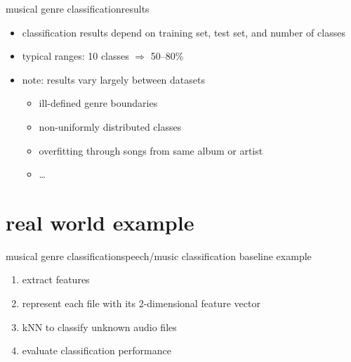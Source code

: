         \begin{frame}{musical genre classification}{results}
            \begin{itemize}
                \item	classification results depend on training set, test set, and number of classes
                \smallskip
                \item<2->	typical ranges: 10 classes $\Rightarrow$ 50--80\%
                \smallskip
                \item<3->	note: results vary largely between datasets
                    \begin{itemize}
                        \item   ill-defined genre boundaries
                        \item   non-uniformly distributed classes
                        \item   overfitting through songs from same album or artist
                        \item   \ldots
                    \end{itemize}
            \end{itemize}
        \end{frame}
    \section[example]{real world example}
        \begin{frame}{musical genre classification}{speech/music classification baseline example}
            \begin{enumerate}
                \item	extract features
                \smallskip
                \item   represent each file with its 2-dimensional feature vector
                \smallskip
                \item   kNN to classify unknown audio files
                \smallskip
                \item   evaluate classification performance
            \end{enumerate}
        \end{frame}

